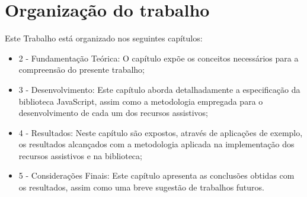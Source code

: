 


\section{Organização do trabalho}

Este Trabalho está organizado nos seguintes capítulos:

\begin{itemize}
    \item 2 - Fundamentação Teórica: O capítulo expõe os conceitos necessários para a compreensão do presente trabalho;
    \item 3 - Desenvolvimento: Este capítulo aborda detalhadamente a especificação da biblioteca JavaScript, assim como a metodologia empregada para o desenvolvimento de cada um dos recursos assistivos;
    \item 4 - Resultados: Neste capítulo são expostos, através de aplicações de exemplo, os resultados alcançados com a metodologia aplicada na implementação dos recursos assistivos e na biblioteca;
    \item 5 - Considerações Finais: Este capítulo apresenta as conclusões obtidas com os resultados, assim como uma breve sugestão de trabalhos futuros.
\end{itemize}

